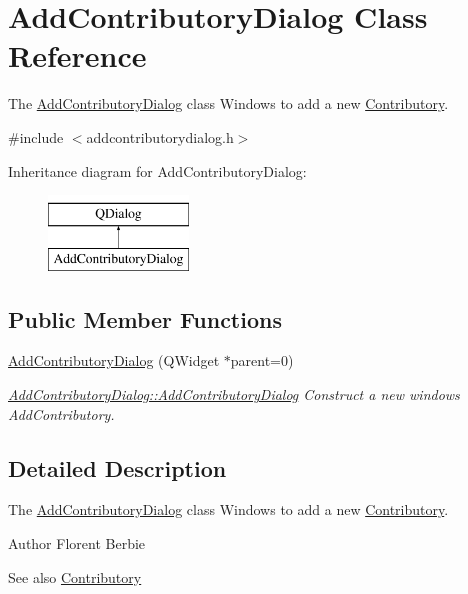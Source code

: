 \hypertarget{classAddContributoryDialog}{\section{Add\+Contributory\+Dialog Class Reference}
\label{classAddContributoryDialog}
}


The \hyperlink{classAddContributoryDialog}{Add\+Contributory\+Dialog} class Windows to add a new \hyperlink{classContributory}{Contributory}.  




{\ttfamily \#include $<$addcontributorydialog.\+h$>$}

Inheritance diagram for Add\+Contributory\+Dialog\+:\begin{figure}[H]
\begin{center}
\leavevmode
\includegraphics[height=2.000000cm]{d9/dfa/classAddContributoryDialog}
\end{center}
\end{figure}
\subsection*{Public Member Functions}
\begin{DoxyCompactItemize}
\item 
\hyperlink{classAddContributoryDialog_a75ef0d55afcf2cc30a702bb4792ccc2b}{Add\+Contributory\+Dialog} (Q\+Widget $\ast$parent=0)
\begin{DoxyCompactList}\small\item\em \hyperlink{classAddContributoryDialog_a75ef0d55afcf2cc30a702bb4792ccc2b}{Add\+Contributory\+Dialog\+::\+Add\+Contributory\+Dialog} Construct a new windows Add\+Contributory. \end{DoxyCompactList}\end{DoxyCompactItemize}


\subsection{Detailed Description}
The \hyperlink{classAddContributoryDialog}{Add\+Contributory\+Dialog} class Windows to add a new \hyperlink{classContributory}{Contributory}. 

\begin{DoxyAuthor}{Author}
Florent Berbie 
\end{DoxyAuthor}
\begin{DoxySeeAlso}{See also}
\hyperlink{classContributory}{Contributory} 
\end{DoxySeeAlso}


